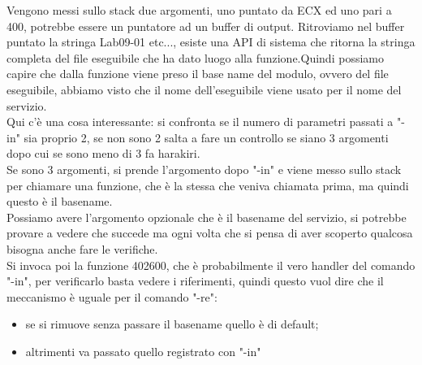 \documentclass[12pt, oneside]{extbook}
\begin{document}
Vengono messi sullo stack due argomenti, uno puntato da ECX ed uno pari a 400, potrebbe essere un puntatore ad un buffer di output. Ritroviamo nel buffer puntato la stringa Lab09-01 etc..., esiste una API di sistema che ritorna la stringa completa del file eseguibile che ha dato luogo alla funzione.Quindi possiamo capire che dalla funzione viene preso il base name del modulo, ovvero del file eseguibile, abbiamo visto che il nome dell'eseguibile viene usato per il nome del servizio.\\Qui c'è una cosa interessante: si confronta se il numero di parametri passati a "-in" sia proprio 2, se non sono 2 salta a fare un controllo se siano 3 argomenti dopo cui se sono meno di 3 fa harakiri.\\Se sono 3 argomenti, si prende l'argomento dopo "-in" e viene messo sullo stack per chiamare una funzione, che è la stessa che veniva chiamata prima, ma quindi questo è il basename.\\Possiamo avere l'argomento opzionale che è il basename del servizio, si potrebbe provare a vedere che succede ma ogni volta che si pensa di aver scoperto qualcosa bisogna anche fare le verifiche.\\Si invoca poi la funzione 402600, che è probabilmente il vero handler del comando "-in", per  verificarlo basta vedere i riferimenti, quindi questo vuol dire che il meccanismo è uguale per il comando "-re":
\begin{itemize}
\item se si rimuove senza passare il basename quello è di default;
\item altrimenti va passato quello registrato con "-in"
\end{itemize}
\end{document}
